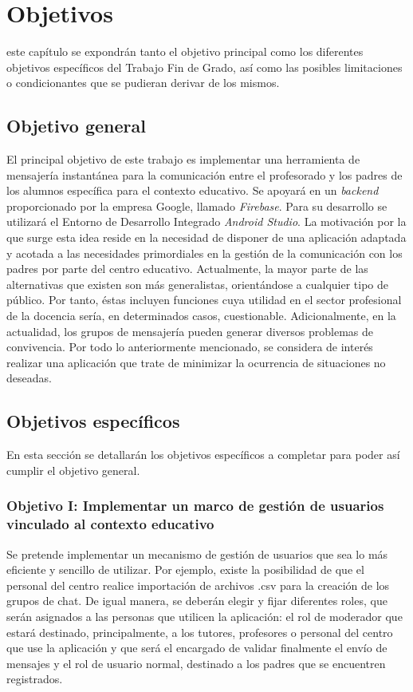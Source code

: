 \chapter{Objetivos}
\label{chap:objetivos}

\noindent

 este capítulo se expondrán tanto el objetivo principal como los diferentes objetivos específicos del Trabajo Fin de Grado, así como las posibles limitaciones o condicionantes que se pudieran derivar de los mismos.

\section{Objetivo general}
El principal objetivo de este trabajo es implementar una herramienta de mensajería instantánea para la comunicación entre el profesorado y los padres de los alumnos específica para el contexto educativo. Se apoyará en un \textit{backend} proporcionado por la empresa Google, llamado \textit{Firebase}. Para su desarrollo se utilizará el Entorno de Desarrollo Integrado \textit{Android Studio}. La motivación por la que surge esta idea reside en la necesidad de disponer de una aplicación adaptada y acotada a las necesidades primordiales en la gestión de la comunicación con los padres por parte del centro educativo. Actualmente, la mayor parte de las alternativas que existen son más generalistas, orientándose a cualquier tipo de público. Por tanto, éstas incluyen funciones cuya utilidad en el sector profesional de la docencia sería, en determinados casos, cuestionable. Adicionalmente, en la actualidad, los grupos de mensajería pueden generar diversos problemas de convivencia. Por todo lo anteriormente mencionado, se considera de interés realizar una aplicación que trate de minimizar la ocurrencia de situaciones no deseadas.

\section{Objetivos específicos}
En esta sección se detallarán los objetivos específicos a completar para poder así cumplir el objetivo general.

\newpage

\subsection{Objetivo I: Implementar un marco de gestión de usuarios vinculado al contexto educativo}
Se pretende implementar un mecanismo de gestión de usuarios que sea lo más eficiente y sencillo de utilizar. Por ejemplo, existe la posibilidad de que el personal del centro realice importación de archivos .csv para la creación de los grupos de chat. De igual manera, se deberán elegir y fijar diferentes roles, que serán asignados a las personas que utilicen la aplicación: el rol de moderador que estará destinado, principalmente, a los tutores, profesores o personal del centro que use la aplicación y que será el encargado de validar finalmente el envío de mensajes y el rol de usuario normal, destinado a los padres que se encuentren registrados.


